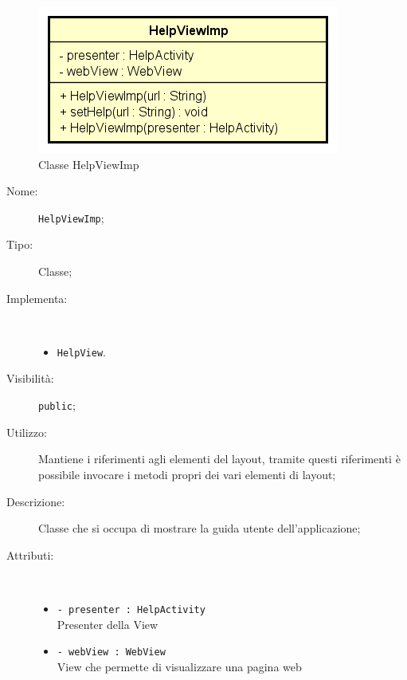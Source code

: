 \documentclass[../DefinizioneDiProdotto.tex]{subfiles}
\begin{document}
    \begin{figure}[H]
        \centering
        \includegraphics{img/HelpViewImp.png}
        \caption{Classe HelpViewImp}\label{fig:view::HelpViewImp} 
    \end{figure}
    \begin{description}
\item[Nome:] \texttt{HelpViewImp};
\item[Tipo:] Classe;
\item[Implementa:] \
\begin{itemize}
\item \texttt{HelpView}.

\end{itemize}
\item[Visibilità:] \texttt{public};
\item[Utilizzo:] Mantiene i riferimenti agli elementi del layout, tramite questi riferimenti è possibile invocare i metodi propri dei vari elementi di layout;
\item[Descrizione:] Classe che si occupa di mostrare la guida utente dell'applicazione;
\item[Attributi:] \
\begin{itemize}
\item \texttt{- presenter : HelpActivity}\\
Presenter della View

\item \texttt{- webView : WebView}\\
View che permette di visualizzare una pagina web


\end{itemize}
\end{description}
\end{document}
